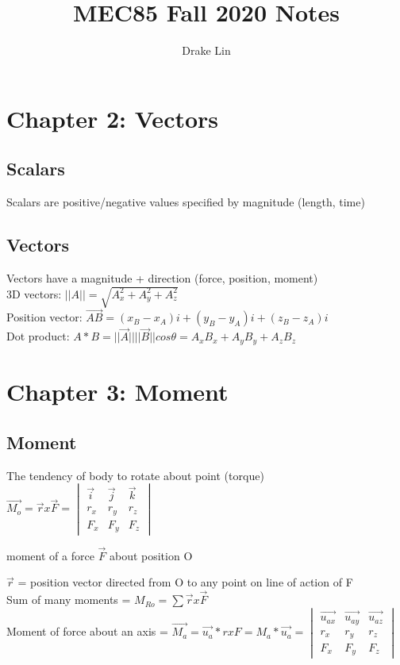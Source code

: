 \documentclass{article}
\title{MEC85 Fall 2020 Notes}
\author{Drake Lin}
\begin{document}
    \maketitle
    \tableofcontents
    \newpage

    \section{Chapter 2: Vectors}
    \subsection{Scalars}
    Scalars are positive/negative values specified by magnitude (length, time)
    
    \subsection{Vectors}
    Vectors have a magnitude + direction (force, position, moment)\\
    3D vectors: $||A|| = \sqrt{A_x^2+A_y^2+A_z^2}$\\
    Position vector: $\vec{AB} = (x_B-x_A)i + (y_B-y_A)i + (z_B-z_A)i$ \\
    Dot product: $A*B = ||\vec{A}||||\vec{B}||cos\theta = A_xB_x + A_yB_y + A_zB_z$



    \section{Chapter 3: Moment}

    \subsection{Moment}
    The tendency of body to rotate about point (torque)\\
    $\vec{M_o} = \vec{r} x \vec{F} =
        \begin{vmatrix}
            \vec{i} & \vec{j} & \vec{k} \\ r_x & r_y & r_z \\ F_x & F_y & F_z
        \end{vmatrix}$ 
    
    moment of a force $\vec{F}$ about position O

    $\vec{r}$ = position vector directed from O to any point on line of action of F\\
    Sum of many moments = $M_{Ro}=\sum \vec{r}x\vec{F}$\\
    Moment of force about an axis = $\vec{M_a}=\vec{u_a}*rxF=M_a*\vec{u_a}=
        \begin{vmatrix}
            \vec{u_{ax}} & \vec{u_{ay}} & \vec{u_{az}} \\ r_x & r_y & r_z \\ F_x & F_y & F_z
        \end{vmatrix}$ 
    
\end{document}

